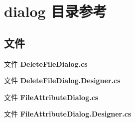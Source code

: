 \section{dialog 目录参考}
\label{dir_3b472af544f5243cd271ccd0b2453ccc}
\subsection*{文件}
\begin{DoxyCompactItemize}
\item 
文件 \textbf{ Delete\+File\+Dialog.\+cs}
\item 
文件 \textbf{ Delete\+File\+Dialog.\+Designer.\+cs}
\item 
文件 \textbf{ File\+Attribute\+Dialog.\+cs}
\item 
文件 \textbf{ File\+Attribute\+Dialog.\+Designer.\+cs}
\end{DoxyCompactItemize}

